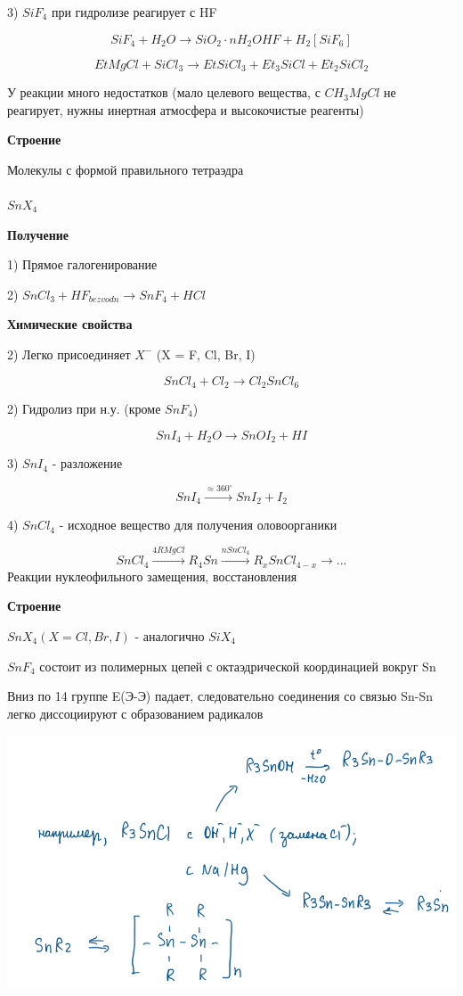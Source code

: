 3) $SiF_4$ при гидролизе реагирует с HF

$$SiF_4 + H_2O \rightarrow SiO_2\cdot nH_2O HF + H_2[SiF_6]$$

$$EtMgCl + SiCl_3 \rightarrow EtSiCl_3 + Et_3SiCl + Et_2SiCl_2$$

У реакции много недостатков (мало целевого вещества, с $CH_3MgCl$ не реагирует, нужны инертная атмосфера и высокочистые реагенты)

\textbf{Строение}

Молекулы с формой правильного тетраэдра\\
\\

$SnX_4$

\textbf{Получение}

1) Прямое галогенирование

2) $SnCl_3 + HF_{bezvodn} \rightarrow SnF_4 + HCl$

\textbf{Химические свойства}

2) Легко присоединяет $X^-$ (X = F, Cl, Br, I)

$$SnCl_4 + Cl_2 \rightarrow Cl_2SnCl_6$$

2) Гидролиз при н.у. (кроме $SnF_4$)

$$SnI_4 + H_2O \rightarrow SnOI_2 + HI$$

3) $SnI_4$ - разложение

$$SnI_4 \xrightarrow{\approx 360^{\circ}} SnI_2 + I_2$$

4) $SnCl_4$ - исходное вещество для получения оловоорганики

$$SnCl_4 \xrightarrow{4RMgCl} R_4Sn \xrightarrow{nSnCl_4} R_xSnCl_{4-x } \rightarrow ...$$
Реакции нуклеофильного замещения, восстановления

\textbf{Строение}

$SnX_4 (X = Cl, Br, I)$ - аналогично $SiX_4$

$SnF_4$ состоит из полимерных цепей  с октаэдрической координацией вокруг Sn

Вниз по 14 группе E(Э-Э) падает, следовательно соединения со связью Sn-Sn легко диссоциируют с образованием радикалов

\includegraphics{images/10v3.png}

